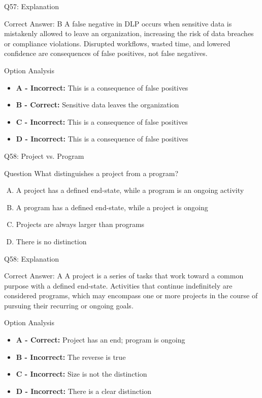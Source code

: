 \documentclass{beamer}
\begin{document}
	\begin{frame}{Q57: Explanation}
		\begin{block}{Correct Answer: B}
			A false negative in DLP occurs when sensitive data is mistakenly allowed to leave an organization, increasing the risk of data breaches or compliance violations. Disrupted workflows, wasted time, and lowered confidence are consequences of false positives, not false negatives.
		\end{block}
		\begin{block}{Option Analysis}
			\begin{itemize}
				\item \textbf{A - Incorrect:} This is a consequence of false positives
				\item \textbf{B - Correct:} Sensitive data leaves the organization
				\item \textbf{C - Incorrect:} This is a consequence of false positives
				\item \textbf{D - Incorrect:} This is a consequence of false positives
			\end{itemize}
		\end{block}
	\end{frame}
	
	\begin{frame}{Q58: Project vs. Program}
		\begin{block}{Question}
			What distinguishes a project from a program?
		\end{block}
		\begin{enumerate}[(A)]
			\item A project has a defined end-state, while a program is an ongoing activity
			\item A program has a defined end-state, while a project is ongoing
			\item Projects are always larger than programs
			\item There is no distinction
		\end{enumerate}
	\end{frame}
	
	\begin{frame}{Q58: Explanation}
		\begin{block}{Correct Answer: A}
			A project is a series of tasks that work toward a common purpose with a defined end-state. Activities that continue indefinitely are considered programs, which may encompass one or more projects in the course of pursuing their recurring or ongoing goals.
		\end{block}
		\begin{block}{Option Analysis}
			\begin{itemize}
				\item \textbf{A - Correct:} Project has an end; program is ongoing
				\item \textbf{B - Incorrect:} The reverse is true
				\item \textbf{C - Incorrect:} Size is not the distinction
				\item \textbf{D - Incorrect:} There is a clear distinction
			\end{itemize}
		\end{block}
	\end{frame}
	
\end{document}
